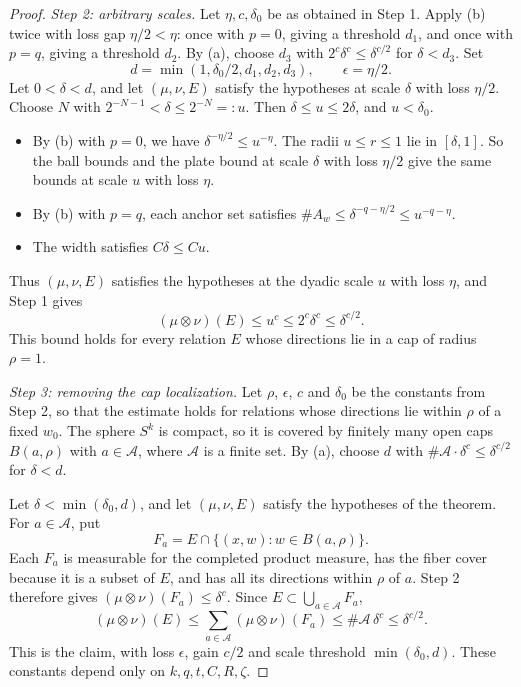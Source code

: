 \begin{proof}
\emph{Step 2: arbitrary scales.} Let $\eta,c,\delta_0$ be as obtained in Step 1. Apply (b) twice with loss gap $\eta/2<\eta$: once with $p=0$, giving a threshold $d_1$, and once with $p=q$, giving a threshold $d_2$. By (a), choose $d_3$ with $2^c\delta^c\le\delta^{c/2}$ for $\delta<d_3$. Set
\[
d=\min(1,\delta_0/2,d_1,d_2,d_3),\qquad \epsilon=\eta/2.
\]
Let $0<\delta<d$, and let $(\mu,\nu,E)$ satisfy the hypotheses at scale $\delta$ with loss $\eta/2$. Choose $N$ with $2^{-N-1}<\delta\le2^{-N}=:u$. Then $\delta\le u\le2\delta$, and $u<\delta_0$.
\begin{itemize}
\item By (b) with $p=0$, we have $\delta^{-\eta/2}\le u^{-\eta}$. The radii $u\le r\le1$ lie in $[\delta,1]$. So the ball bounds and the plate bound at scale $\delta$ with loss $\eta/2$ give the same bounds at scale $u$ with loss $\eta$.
\item By (b) with $p=q$, each anchor set satisfies $\#A_w\le\delta^{-q-\eta/2}\le u^{-q-\eta}$.
\item The width satisfies $C\delta\le Cu$.
\end{itemize}
Thus $(\mu,\nu,E)$ satisfies the hypotheses at the dyadic scale $u$ with loss $\eta$, and Step 1 gives
\[
(\mu\otimes\nu)(E)\le u^c\le2^c\delta^c\le\delta^{c/2}.
\]
This bound holds for every relation $E$ whose directions lie in a cap of radius $\rho=1$.

\emph{Step 3: removing the cap localization.} Let $\rho$, $\epsilon$, $c$ and $\delta_0$ be the constants from Step 2, so that the estimate holds for relations whose directions lie within $\rho$ of a fixed $w_0$. The sphere $S^k$ is compact, so it is covered by finitely many open caps $B(a,\rho)$ with $a\in\mathcal A$, where $\mathcal A$ is a finite set. By (a), choose $d$ with $\#\mathcal A\cdot\delta^c\le\delta^{c/2}$ for $\delta<d$.

Let $\delta<\min(\delta_0,d)$, and let $(\mu,\nu,E)$ satisfy the hypotheses of the theorem. For $a\in\mathcal A$, put
\[
F_a=E\cap\{(x,w):w\in B(a,\rho)\}.
\]
Each $F_a$ is measurable for the completed product measure, has the fiber cover because it is a subset of $E$, and has all its directions within $\rho$ of $a$. Step 2 therefore gives $(\mu\otimes\nu)(F_a)\le\delta^c$. Since $E\subset\bigcup_{a\in\mathcal A}F_a$,
\[
(\mu\otimes\nu)(E)\le\sum_{a\in\mathcal A}(\mu\otimes\nu)(F_a)\le\#\mathcal A\,\delta^c\le\delta^{c/2}.
\]
This is the claim, with loss $\epsilon$, gain $c/2$ and scale threshold $\min(\delta_0,d)$. These constants depend only on $k,q,t,C,R,\zeta$.
\end{proof}
